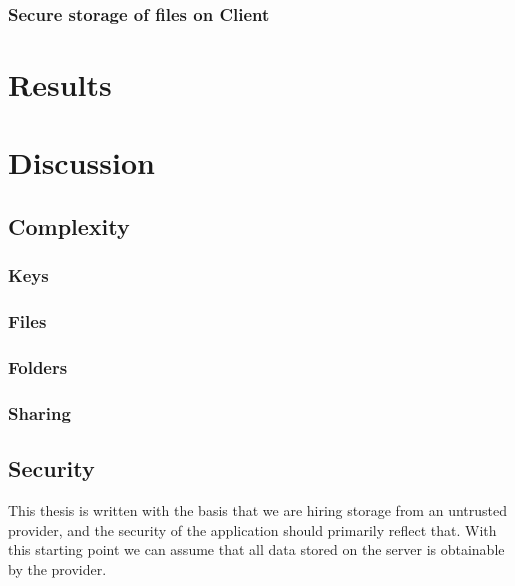\documentclass[pdftex,english,10pt,b5paper,twoside]{book}
\begin{document}

\subsection{Secure storage of files on Client}

\chapter{Results}

\chapter{Discussion}
\section{Complexity}

\subsection{Keys}

\subsection{Files}

\subsection{Folders}

\subsection{Sharing}

\section{Security}
This thesis is written with the basis that we are hiring storage from an
untrusted provider, and the security of the application should primarily
reflect that. With this starting point we can assume that all data stored on
the server is obtainable by the provider.
\end{document}
